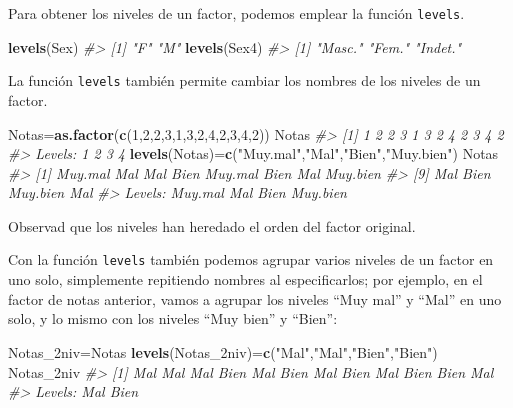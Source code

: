 \documentclass[
]{book}
\newenvironment{Shaded}{\begin{snugshade}}{\end{snugshade}}
\newcommand{\CommentTok}[1]{\textcolor[rgb]{0.56,0.35,0.01}{\textit{#1}}}
\newcommand{\DecValTok}[1]{\textcolor[rgb]{0.00,0.00,0.81}{#1}}
\newcommand{\KeywordTok}[1]{\textcolor[rgb]{0.13,0.29,0.53}{\textbf{#1}}}
\newcommand{\NormalTok}[1]{#1}
\newcommand{\StringTok}[1]{\textcolor[rgb]{0.31,0.60,0.02}{#1}}
\theoremstyle{definition}
\theoremstyle{definition}
\theoremstyle{definition}
\theoremstyle{remark}
\begin{document}
Para obtener los niveles de un factor, podemos emplear la función \texttt{levels}.

\begin{Shaded}
\begin{Highlighting}[]
\KeywordTok{levels}\NormalTok{(Sex)}
\CommentTok{\#\textgreater{} [1] "F" "M"}
\KeywordTok{levels}\NormalTok{(Sex4)}
\CommentTok{\#\textgreater{} [1] "Masc."  "Fem."   "Indet."}
\end{Highlighting}
\end{Shaded}

La función \texttt{levels} también permite cambiar los nombres de los niveles de un factor.

\begin{Shaded}
\begin{Highlighting}[]
\NormalTok{Notas=}\KeywordTok{as.factor}\NormalTok{(}\KeywordTok{c}\NormalTok{(}\DecValTok{1}\NormalTok{,}\DecValTok{2}\NormalTok{,}\DecValTok{2}\NormalTok{,}\DecValTok{3}\NormalTok{,}\DecValTok{1}\NormalTok{,}\DecValTok{3}\NormalTok{,}\DecValTok{2}\NormalTok{,}\DecValTok{4}\NormalTok{,}\DecValTok{2}\NormalTok{,}\DecValTok{3}\NormalTok{,}\DecValTok{4}\NormalTok{,}\DecValTok{2}\NormalTok{))}
\NormalTok{Notas}
\CommentTok{\#\textgreater{}  [1] 1 2 2 3 1 3 2 4 2 3 4 2}
\CommentTok{\#\textgreater{} Levels: 1 2 3 4}
\KeywordTok{levels}\NormalTok{(Notas)=}\KeywordTok{c}\NormalTok{(}\StringTok{"Muy.mal"}\NormalTok{,}\StringTok{"Mal"}\NormalTok{,}\StringTok{"Bien"}\NormalTok{,}\StringTok{"Muy.bien"}\NormalTok{)}
\NormalTok{Notas}
\CommentTok{\#\textgreater{}  [1] Muy.mal  Mal      Mal      Bien     Muy.mal  Bien     Mal      Muy.bien}
\CommentTok{\#\textgreater{}  [9] Mal      Bien     Muy.bien Mal     }
\CommentTok{\#\textgreater{} Levels: Muy.mal Mal Bien Muy.bien}
\end{Highlighting}
\end{Shaded}

Observad que los niveles han heredado el orden del factor original.

Con la función \texttt{levels} también podemos agrupar varios niveles de un factor en uno solo, simplemente repitiendo nombres al especificarlos; por ejemplo, en el factor de notas anterior, vamos a agrupar los niveles ``Muy mal'' y ``Mal'' en uno solo, y lo mismo con los niveles ``Muy bien'' y ``Bien'':

\begin{Shaded}
\begin{Highlighting}[]
\NormalTok{Notas\_2niv=Notas}
\KeywordTok{levels}\NormalTok{(Notas\_2niv)=}\KeywordTok{c}\NormalTok{(}\StringTok{"Mal"}\NormalTok{,}\StringTok{"Mal"}\NormalTok{,}\StringTok{"Bien"}\NormalTok{,}\StringTok{"Bien"}\NormalTok{)}
\NormalTok{Notas\_2niv}
\CommentTok{\#\textgreater{}  [1] Mal  Mal  Mal  Bien Mal  Bien Mal  Bien Mal  Bien Bien Mal }
\CommentTok{\#\textgreater{} Levels: Mal Bien}
\end{Highlighting}
\end{Shaded}
\end{document}
